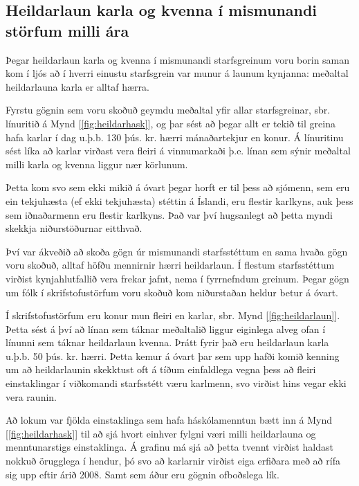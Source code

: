 \subsection{Heildarlaun karla og kvenna í mismunandi störfum milli ára}
Þegar heildarlaun karla og kvenna í mismunandi starfsgreinum voru borin saman kom í ljós að í hverri einustu starfsgrein var munur á launum kynjanna: meðaltal heildarlauna karla er alltaf hærra.

Fyrstu gögnin sem voru skoðuð geymdu meðaltal yfir allar starfsgreinar, sbr. línuritið á Mynd [\ref{fig:heildarhask}], og þar sést að þegar allt er tekið til greina hafa karlar í dag u.þ.b. 130 þús. kr. hærri mánaðartekjur en konur. Á línuritinu sést líka að karlar virðast vera fleiri á vinnumarkaði þ.e. línan sem sýnir meðaltal milli karla og kvenna liggur nær körlunum.

Þetta kom svo sem ekki mikið á óvart þegar horft er til þess að sjómenn, sem eru ein tekjuhæsta (ef ekki tekjuhæsta) stéttin á Íslandi, eru flestir karlkyns, auk þess sem iðnaðarmenn eru flestir karlkyns. 
Það var því hugsanlegt að þetta myndi skekkja niðurstöðurnar eitthvað.

Því var ákveðið að skoða gögn úr mismunandi starfsstéttum en sama hvaða gögn voru skoðuð, alltaf höfðu mennirnir hærri heildarlaun. Í flestum starfsstéttum virðist kynjahlutfallið vera frekar jafnt, nema í fyrrnefndum greinum. Þegar gögn um fólk í skrifstofustörfum voru skoðuð kom niðurstaðan heldur betur á óvart.

Í skrifstofustörfum eru konur mun fleiri en karlar, sbr. Mynd [\ref{fig:heildarlaun}]. Þetta sést á því að línan sem táknar meðaltalið liggur eiginlega alveg ofan í línunni sem táknar heildarlaun kvenna. Þrátt fyrir það eru heildarlaun karla u.þ.b. 50 þús. kr. hærri. Þetta kemur á óvart þar sem upp hafði komið kenning um að heildarlaunin skekktust oft á tíðum einfaldlega vegna þess að fleiri einstaklingar í viðkomandi starfsstétt væru karlmenn, svo virðist hins vegar ekki vera raunin.

Að lokum var fjölda einstaklinga sem hafa háskólamenntun bætt inn á Mynd [\ref{fig:heildarhask}] til að sjá hvort einhver fylgni væri milli heildarlauna og menntunarstigs einstaklinga. Á grafinu má sjá að þetta tvennt virðist haldast nokkuð örugglega í hendur, þó svo að karlarnir virðist eiga erfiðara með að rífa sig upp eftir árið 2008. Samt sem áður eru gögnin ofboðslega lík.